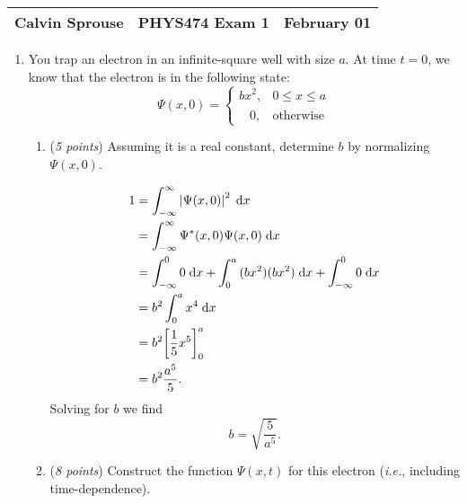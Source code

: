 \documentclass[a4paper, 12pt]{config/homework}
\begin{document}
\noindent
\begin{tabularx}{\textwidth}{>{\centering\arraybackslash}X>{\centering\arraybackslash}X>{\centering\arraybackslash}X}
Calvin Sprouse & PHYS474 Exam 1 & 2024 February 01\\
\midrule
\end{tabularx}

\begin{enumerate}
\item You trap an electron in an infinite-square well with size \(a\). At time \(t=0\), we know that the electron is in the following state:
\[\Psi(x,0) = \begin{cases}
    bx^2, & 0 \le x \le a \\
    \phantom{b^2}0, & \text{otherwise}
\end{cases}\]
\begin{enumerate}[label=(\alph*)]
\item (\textit{5 points}) Assuming it is a real constant, determine \(b\) by normalizing \(\Psi(x,0)\).

\begin{align*}
1 &= \bint{-\infty}{\infty}{\left|\Psi(x,0)\right|^2}{x}
\\&= \bint{-\infty}{\infty}{\Psi^*(x,0)\Psi(x,0)}{x}
\\&= \bint{-\infty}{0}{0}{x} + \bint{0}{a}{(bx^2)(bx^2)}{x} + \bint{-\infty}{0}{0}{x}
\\&= b^2 \bint{0}{a}{x^4}{x}
\\&= b^2 {\left[ \frac{1}{5}x^5 \right]}_0^a
\\&= b^2 \frac{a^5}{5}.
\end{align*}
Solving for \(b\) we find
\[b = \sqrt{\frac{5}{a^5}}.\]

\pagebreak
\item (\textit{8 points}) Construct the function \(\Psi(x,t)\) for this electron (\textit{i.e.}, including time-dependence).


\end{enumerate}
\end{enumerate}
\end{document}
